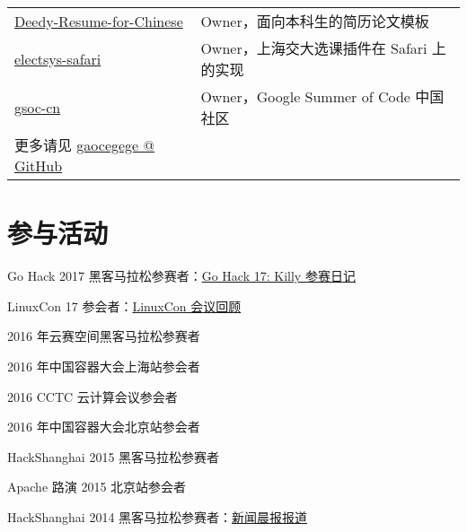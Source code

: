 \documentclass[]{deedy-resume-openfont}
\begin{document}
\begin{minipage}[t]{0.68\textwidth}
\begin{tabular}{ll}
\href{https://github.com/dyweb/Deedy-Resume-for-Chinese}{Deedy-Resume-for-Chinese} & Owner，面向本科生的简历论文模板 \\
\href{https://github.com/dyweb/electsys-safari}{electsys-safari} & Owner，上海交大选课插件在 Safari 上的实现 \\
\href{https://github.com/gsoc-cn/gsoc-cn}{gsoc-cn} & Owner，Google Summer of Code 中国社区 \\
更多请见 \href{https://github.com/gaocegege}{gaocegege @ GitHub} & \\
\end{tabular}
\sectionsep

\section{参与活动}
\sectionsep
\sectionsep
\begin{tightemize}
    \item Go Hack 2017 黑客马拉松参赛者：\href{http://gaocegege.com/Blog/%E9%9A%8F%E7%AC%94/killy}{Go Hack 17: Killy 参赛日记}
    \item LinuxCon 17 参会者：\href{http://gaocegege.com/Blog/%E9%9A%8F%E7%AC%94/linuxcon}{LinuxCon 会议回顾}
    \item 2016 年云赛空间黑客马拉松参赛者
    \item 2016 年中国容器大会上海站参会者
    \item 2016 CCTC 云计算会议参会者
    \item 2016 年中国容器大会北京站参会者
    \item HackShanghai 2015 黑客马拉松参赛者
    \item Apache 路演 2015 北京站参会者
    \item HackShanghai 2014 黑客马拉松参赛者：\href{http://newspaper.jfdaily.com/xwcb/html/2014-11/17/content_37290.htm}{新闻晨报报道}
\end{tightemize}
\sectionsep

\sectionsep\end{minipage}
\end{document}
